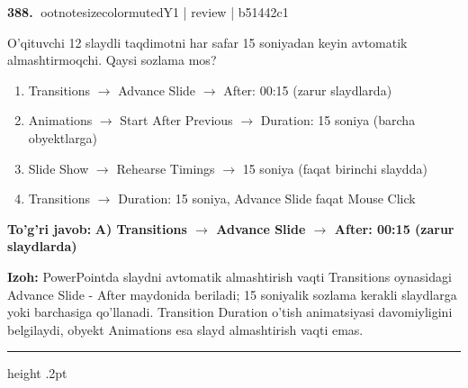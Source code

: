 \documentclass[10pt,a4paper]{article}
\begin{document}
\textbf{\color{ink}388.} {ootnotesizecolor{muted}Y1 | review | b51442c1}
\par
O'qituvchi 12 slaydli taqdimotni har safar 15 soniyadan keyin avtomatik almashtirmoqchi. Qaysi sozlama mos?
\begin{enumerate}[label=\Alph*),leftmargin=9mm]
\item Transitions \ensuremath{\rightarrow} Advance Slide \ensuremath{\rightarrow} After: 00:15 (zarur slaydlarda)
\item Animations \ensuremath{\rightarrow} Start After Previous \ensuremath{\rightarrow} Duration: 15 soniya (barcha obyektlarga)
\item Slide Show \ensuremath{\rightarrow} Rehearse Timings \ensuremath{\rightarrow} 15 soniya (faqat birinchi slaydda)
\item Transitions \ensuremath{\rightarrow} Duration: 15 soniya, Advance Slide faqat Mouse Click
\end{enumerate}
\begin{tcolorbox}[enhanced,breakable,colback=teal!4,colframe=teal!55!black,boxrule=0.45pt,arc=1.2mm,left=2.8mm,right=2.8mm,top=2mm,bottom=2mm]
\textbf{\color{teal}To'g'ri javob:} \textbf{A) Transitions \ensuremath{\rightarrow} Advance Slide \ensuremath{\rightarrow} After: 00:15 (zarur slaydlarda)}
\par\smallskip
\textbf{Izoh:} PowerPointda slaydni avtomatik almashtirish vaqti Transitions oynasidagi Advance Slide - After maydonida beriladi; 15 soniyalik sozlama kerakli slaydlarga yoki barchasiga qo'llanadi. Transition Duration o'tish animatsiyasi davomiyligini belgilaydi, obyekt Animations esa slayd almashtirish vaqti emas.
\end{tcolorbox}
\vspace{2mm}\hrule height .2pt\vspace{2mm}
\end{document}
